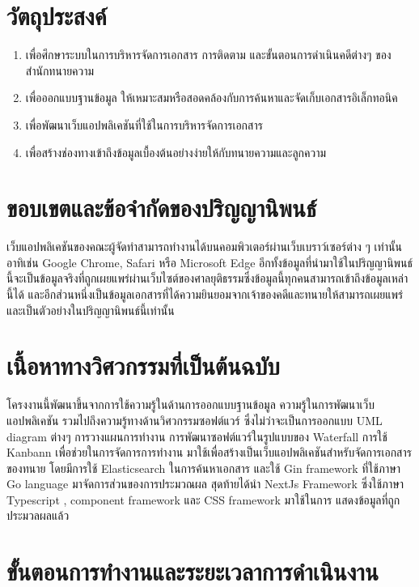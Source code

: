 \documentclass[12pt,oneside,openright,a4paper]{cpe-thai-project}
\begin{document}
\section{วัตถุประสงค์}
\begin{enumerate}
  \item เพื่อศึกษาระบบในการบริหารจัดการเอกสาร การติดตาม และขั้นตอนการดำเนินคดีต่างๆ ของสำนักทนายความ
  \item เพื่อออกแบบฐานข้อมูล ให้เหมาะสมหรือสอดคล้องกับการค้นหาและจัดเก็บเอกสารอิเล็กทอนิค
  \item เพื่อพัฒนาเว็บแอปพลิเคชันที่ใช้ในการบริหารจัดการเอกสาร
  \item เพื่อสร้างช่องทางเข้าถึงข้อมูลเบื้องต้นอย่างง่ายให้กับทนายความและลูกความ
\end{enumerate}

\section{ขอบเขตและข้อจำกัดของปริญญานิพนธ์}
\hspace*{1cm}เว็บแอปพลิเคชันของคณะผู้จัดทำสามารถทำงานได้บนคอมพิวเตอร์ผ่านเว็บเบราว์เซอร์ต่าง ๆ เท่านั้นอาทิเช่น Google Chrome, Safari หรือ Microsoft Edge อีกทั้งข้อมูลที่นำมาใช้ในปริญญานิพนธ์นี้จะเป็นข้อมูลจริงที่ถูกเผยแพร่ผ่านเว็บไซต์ของศาลยุติธรรมซึ่งข้อมูลนี้ทุกคนสามารถเข้าถึงข้อมูลเหล่านี้ได้ และอีกส่วนหนึ่งเป็นข้อมูลเอกสารที่ได้ความยินยอมจากเจ้าของคดีและทนายให้สามารถเผยแพร่และเป็นตัวอย่างในปริญญานิพนธ์นี้เท่านั้น

\section{เนื้อหาทางวิศวกรรมที่เป็นต้นฉบับ}
\hspace*{1cm}โครงงานนี้พัฒนาขึ้นจากการใช้ความรู้ในด้านการออกแบบฐานข้อมูล ความรู้ในการพัฒนาเว็บแอปพลิเคชัน รวมไปถึงความรู้ทางด้านวิศวกรรมซอฟต์แวร์ ซึ่งไม่ว่าจะเป็นการออกแบบ UML diagram ต่างๆ การวางแผนการทำงาน การพัฒนาซอฟต์แวร์ในรูปแบบของ Waterfall การใช้ Kanbann เพื่อช่วยในการจัดการการทำงาน มาใช้เพื่อสร้างเป็นเว็บแอปพลิเคชันสำหรับจัดการเอกสารของทนาย โดยมีการใช้ Elasticsearch ในการค้นหาเอกสาร และใช้ Gin framework ที่ใช้ภาษา Go language มาจัดการส่วนของการประมวณผล สุดท้ายได้นำ NextJs Framework ซึ่งใช้ภาษา Typescript , component framework และ CSS framework มาใช้ในการ แสดงข้อมูลที่ถูกประมวลผลแล้ว 

\newpage
\section{ขั้นตอนการทํางานและระยะเวลาการดําเนินงาน}
\end{document}
